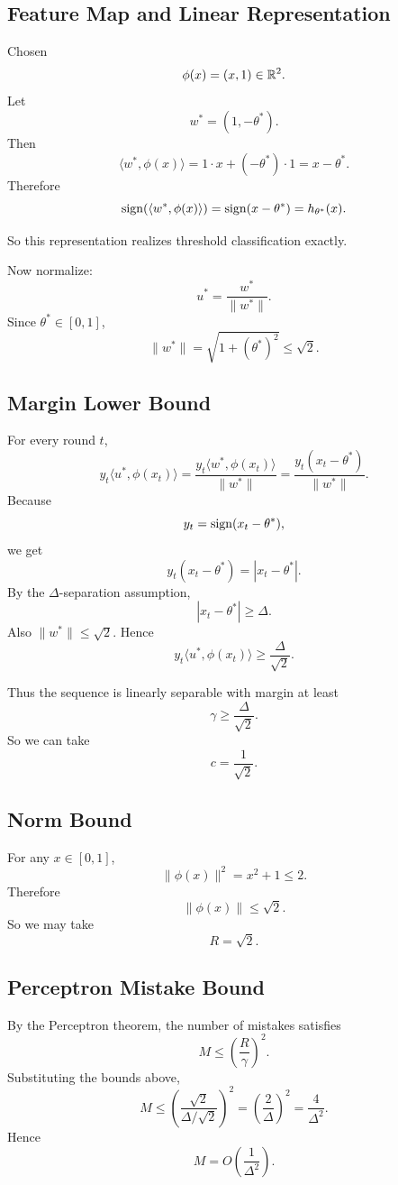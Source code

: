 \documentclass{article}
\begin{document}
\begin{solutionbox}

\subsection{Feature Map and Linear Representation}

Chosen
\[
\phi(x)=(x,1)\in \mathbb{R}^2.
\]
Let
\[
w^*=(1,-\theta^*).
\]
Then
\[
\langle w^*,\phi(x)\rangle
=
1\cdot x + (-\theta^*)\cdot 1
=
x-\theta^*.
\]
Therefore
\[
\operatorname{sign}(\langle w^*,\phi(x)\rangle)
=
\operatorname{sign}(x-\theta^*)
=
h_{\theta^*}(x).
\]

So this representation realizes threshold classification exactly.

Now normalize:
\[
u^*=\frac{w^*}{\|w^*\|}.
\]
Since $\theta^*\in[0,1]$,
\[
\|w^*\|
=
\sqrt{1+(\theta^*)^2}
\le
\sqrt{2}.
\]

\subsection{Margin Lower Bound}

For every round $t$,
\[
y_t\langle u^*,\phi(x_t)\rangle
=
\frac{y_t\langle w^*,\phi(x_t)\rangle}{\|w^*\|}
=
\frac{y_t(x_t-\theta^*)}{\|w^*\|}.
\]
Because
\[
y_t=\operatorname{sign}(x_t-\theta^*),
\]
we get
\[
y_t(x_t-\theta^*) = |x_t-\theta^*|.
\]
By the $\Delta$-separation assumption,
\[
|x_t-\theta^*| \ge \Delta.
\]
Also $\|w^*\|\le \sqrt{2}$. Hence
\[
y_t\langle u^*,\phi(x_t)\rangle
\ge
\frac{\Delta}{\sqrt{2}}.
\]

Thus the sequence is linearly separable with margin at least
\[
\gamma \ge \frac{\Delta}{\sqrt{2}}.
\]
So we can take
\[
c=\frac{1}{\sqrt{2}}.
\]

\subsection{Norm Bound}

For any $x\in[0,1]$,
\[
\|\phi(x)\|^2 = x^2+1 \le 2.
\]
Therefore
\[
\|\phi(x)\| \le \sqrt{2}.
\]
So we may take
\[
R=\sqrt{2}.
\]

\subsection{Perceptron Mistake Bound}

By the Perceptron theorem, the number of mistakes satisfies
\[
M \le \left(\frac{R}{\gamma}\right)^2.
\]
Substituting the bounds above,
\[
M
\le
\left(\frac{\sqrt{2}}{\Delta/\sqrt{2}}\right)^2
=
\left(\frac{2}{\Delta}\right)^2
=
\frac{4}{\Delta^2}.
\]
Hence
\[
M = O\!\left(\frac{1}{\Delta^2}\right).
\]


\end{solutionbox}
\end{document}
